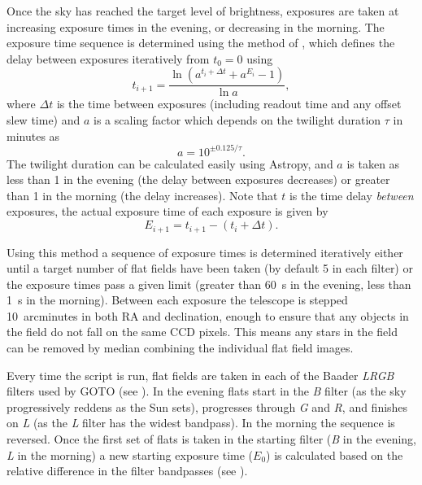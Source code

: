 \begin{colsection}
Once the sky has reached the target level of brightness, exposures are taken at increasing exposure times in the evening, or decreasing in the morning. The exposure time sequence is determined using the method of \citet{flats3}, which defines the delay between exposures iteratively from $t_0=0$ using
%
\begin{equation}
    t_{i+1} = \frac{\ln{(a^{t_i+\Delta t} + a^{E_i} -1)}}{\ln{a}},
    \label{eq:sky}
\end{equation}
%
where $\Delta t$ is the time between exposures (including readout time and any offset slew time) and $a$ is a scaling factor which depends on the twilight duration $\tau$ in minutes as
%
\begin{equation}
    a = 10^{\pm 0.125/\tau}.
    \label{eq:sky2}
\end{equation}
%
The twilight duration can be calculated easily using Astropy, and $a$ is taken as less than 1 in the evening (the delay between exposures decreases) or greater than 1 in the morning (the delay increases). Note that $t$ is the time delay \emph{between} exposures, the actual exposure time of each exposure is given by
%
\begin{equation}
    E_{i+1} = t_{i+1} - (t_i + \Delta t).
    \label{eq:sky3}
\end{equation}

Using this method a sequence of exposure times is determined iteratively either until a target number of flat fields have been taken (by default 5 in each filter) or the exposure times pass a given limit (greater than \SI{60}{\second} in the evening, less than \SI{1}{\second} in the morning). Between each exposure the telescope is stepped 10~arcminutes in both RA and declination, enough to ensure that any objects in the field do not fall on the same CCD pixels. This means any stars in the field can be removed by median combining the individual flat field images.

Every time the script is run, flat fields are taken in each of the Baader \textit{LRGB} filters used by GOTO (see ). In the evening flats start in the \textit{B} filter (as the sky progressively reddens as the Sun sets), progresses through \textit{G} and \textit{R}, and finishes on \textit{L} (as the \textit{L} filter has the widest bandpass). In the morning the sequence is reversed. Once the first set of flats is taken in the starting filter (\textit{B} in the evening, \textit{L} in the morning) a new starting exposure time ($E_0$) is calculated based on the relative difference in the filter bandpasses (see ).


\end{colsection}
